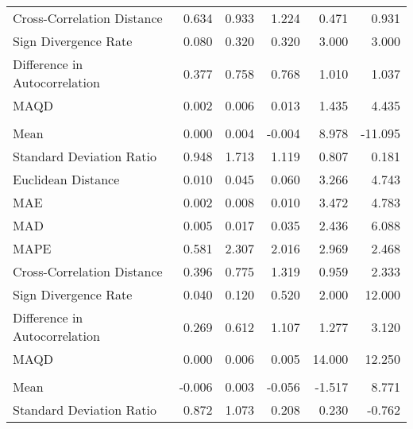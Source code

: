 \begin{landscape}
\begin{ThreePartTable}
\begin{longtable}[t]{lrrrrr}
\hspace{1em}Cross-Correlation Distance & 0.634 & 0.933 & 1.224 & 0.471 & 0.931\\
\hspace{1em}Sign Divergence Rate & 0.080 & 0.320 & 0.320 & 3.000 & 3.000\\
\hspace{1em}Difference in Autocorrelation & 0.377 & 0.758 & 0.768 & 1.010 & 1.037\\
\hspace{1em}MAQD & 0.002 & 0.006 & 0.013 & 1.435 & 4.435\\
\addlinespace[0.5em]
\multicolumn{6}{l}{\textbf{MEX}}\\
\hline
\hspace{1em}Mean & 0.000 & 0.004 & -0.004 & 8.978 & -11.095\\
\hspace{1em}Standard Deviation Ratio & 0.948 & 1.713 & 1.119 & 0.807 & 0.181\\
\hspace{1em}Euclidean Distance & 0.010 & 0.045 & 0.060 & 3.266 & 4.743\\
\hspace{1em}MAE & 0.002 & 0.008 & 0.010 & 3.472 & 4.783\\
\hspace{1em}MAD & 0.005 & 0.017 & 0.035 & 2.436 & 6.088\\
\hspace{1em}MAPE & 0.581 & 2.307 & 2.016 & 2.969 & 2.468\\
\hspace{1em}Cross-Correlation Distance & 0.396 & 0.775 & 1.319 & 0.959 & 2.333\\
\hspace{1em}Sign Divergence Rate & 0.040 & 0.120 & 0.520 & 2.000 & 12.000\\
\hspace{1em}Difference in Autocorrelation & 0.269 & 0.612 & 1.107 & 1.277 & 3.120\\
\hspace{1em}MAQD & 0.000 & 0.006 & 0.005 & 14.000 & 12.250\\
\addlinespace[0.5em]
\multicolumn{6}{l}{\textbf{MLT}}\\
\hline
\hspace{1em}Mean & -0.006 & 0.003 & -0.056 & -1.517 & 8.771\\
\hspace{1em}Standard Deviation Ratio & 0.872 & 1.073 & 0.208 & 0.230 & -0.762\\

\end{longtable}
\end{ThreePartTable}
\end{landscape}
